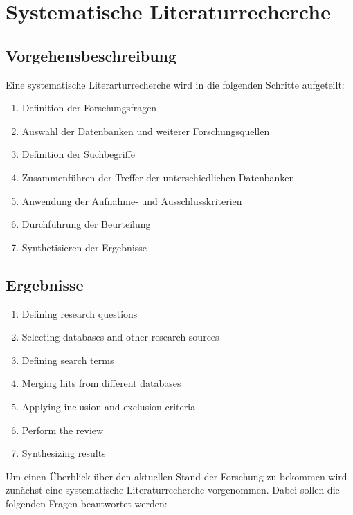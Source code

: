 \chapter{Systematische Literaturrecherche} \label{systematische_literaturrecherche}

\section{Vorgehensbeschreibung}

Eine systematische Literarturrecherche wird in die folgenden Schritte aufgeteilt:

\begin{enumerate}
    \item Definition der Forschungsfragen
    \item Auswahl der Datenbanken und weiterer Forschungsquellen
    \item Definition der Suchbegriffe
    \item Zusammenführen der Treffer der unterschiedlichen Datenbanken
    \item Anwendung der Aufnahme- und Ausschlusskriterien
    \item Durchführung der Beurteilung
    \item Synthetisieren der Ergebnisse
\end{enumerate}

\section{Ergebnisse}

\begin{enumerate}
    \item Defining research questions
    \item Selecting databases and other research sources
    \item Defining search terms
    \item Merging hits from different databases
    \item Applying inclusion and exclusion criteria
    \item Perform the review
    \item Synthesizing results
\end{enumerate}

Um einen Überblick über den aktuellen Stand der Forschung zu bekommen wird zunächst eine systematische Literaturrecherche vorgenommen. Dabei sollen die folgenden Fragen beantwortet werden:

